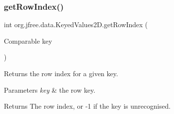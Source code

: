 \mbox{\label{interfaceorg_1_1jfree_1_1data_1_1_keyed_values2_d_ae92ded12999f2872687a5754ddf29254}} 
\subsubsection{\texorpdfstring{get\+Row\+Index()}{getRowIndex()}}
{\footnotesize\ttfamily int org.\+jfree.\+data.\+Keyed\+Values2\+D.\+get\+Row\+Index (\begin{DoxyParamCaption}\item[{Comparable}]{key }\end{DoxyParamCaption})}

Returns the row index for a given key.


\begin{DoxyParams}{Parameters}
{\em key} & the row key.\\
\hline
\end{DoxyParams}
\begin{DoxyReturn}{Returns}
The row index, or {\ttfamily -\/1} if the key is unrecognised. 
\end{DoxyReturn}


